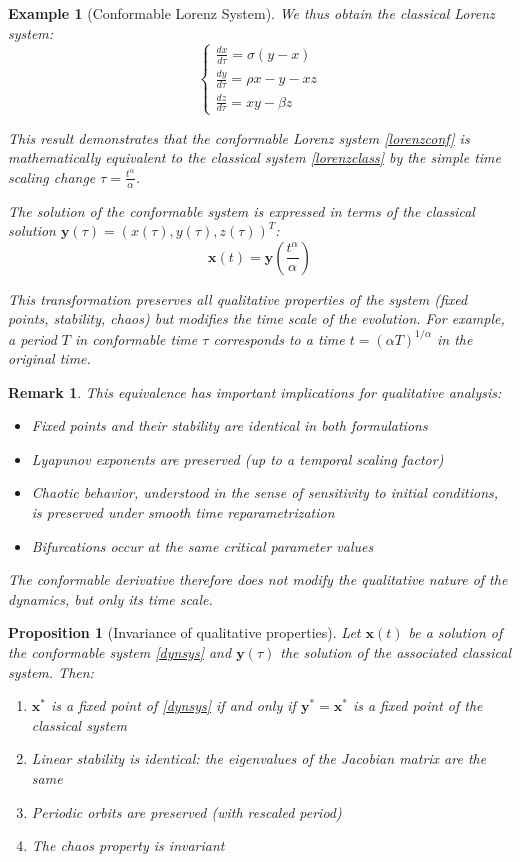 \documentclass[preprint,12pt]{elsarticle}
\newtheorem{proposition}{Proposition}
\newtheorem{example}{Example}
\newtheorem{remark}{Remark}
\begin{document}
\begin{example}[Conformable Lorenz System]
We thus obtain the classical Lorenz system:
\begin{equation}\label{lorenzclass}
\begin{cases}
\frac{dx}{d\tau} = \sigma(y - x) \\
\frac{dy}{d\tau} = \rho x - y - xz \\
\frac{dz}{d\tau} = xy - \beta z
\end{cases}
\end{equation}

This result demonstrates that the conformable Lorenz system \eqref{lorenzconf} is mathematically equivalent to the classical system \eqref{lorenzclass} by the simple time scaling change $\tau = \frac{t^\alpha}{\alpha}$.

The solution of the conformable system is expressed in terms of the classical solution $\mathbf{y}(\tau) = (x(\tau), y(\tau), z(\tau))^T$:
\[
\mathbf{x}(t) = \mathbf{y}\left( \frac{t^\alpha}{\alpha} \right)
\]

This transformation preserves all qualitative properties of the system (fixed points, stability, chaos) but modifies the time scale of the evolution. For example, a period $T$ in conformable time $\tau$ corresponds to a time $t = (\alpha T)^{1/\alpha}$ in the original time.
\end{example}

\begin{remark}
This equivalence has important implications for qualitative analysis:
\begin{itemize}
\item Fixed points and their stability are identical in both formulations
\item Lyapunov exponents are preserved (up to a temporal scaling factor)
\item Chaotic behavior, understood in the sense of sensitivity to initial conditions, is preserved under smooth time reparametrization
\item Bifurcations occur at the same critical parameter values
\end{itemize}
The conformable derivative therefore does not modify the qualitative nature of the dynamics, but only its time scale.
\end{remark}

\begin{proposition}[Invariance of qualitative properties]
Let $\mathbf{x}(t)$ be a solution of the conformable system \eqref{dynsys} and $\mathbf{y}(\tau)$ the solution of the associated classical system. Then:
\begin{enumerate}
\item $\mathbf{x}^*$ is a fixed point of \eqref{dynsys} if and only if $\mathbf{y}^* = \mathbf{x}^*$ is a fixed point of the classical system
\item Linear stability is identical: the eigenvalues of the Jacobian matrix are the same
\item Periodic orbits are preserved (with rescaled period)
\item The chaos property is invariant
\end{enumerate}
\end{proposition}
\end{document}
